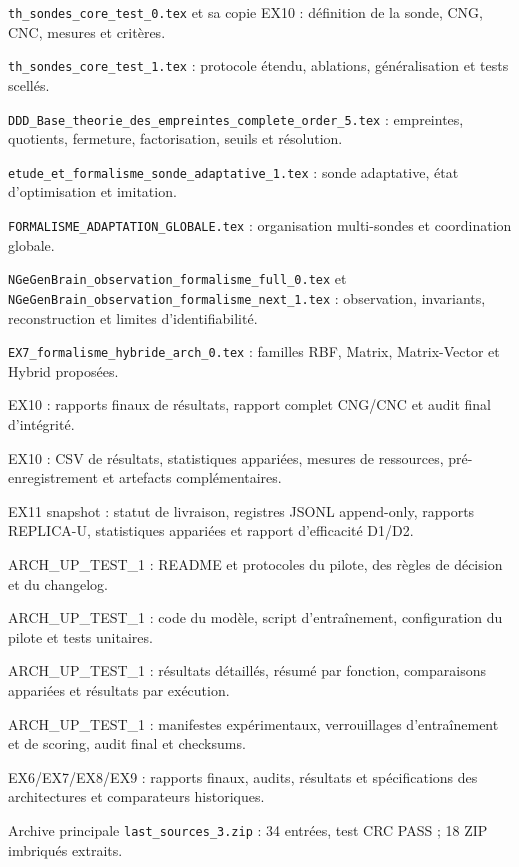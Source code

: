 \documentclass[11pt,a4paper]{article}
\newcommand{\code}[1]{\texttt{\small #1}}
\begin{document}
\begin{description}[leftmargin=1.2cm,labelwidth=0.9cm,style=nextline]
  \item[S1] \code{th\_\allowbreak{}sondes\_\allowbreak{}core\_\allowbreak{}test\_\allowbreak{}0.tex} et sa copie EX10 : définition de la sonde, CNG, CNC, mesures et critères.
  \item[S2] \code{th\_\allowbreak{}sondes\_\allowbreak{}core\_\allowbreak{}test\_\allowbreak{}1.tex} : protocole étendu, ablations, généralisation et tests scellés.
  \item[S3] \code{DDD\_\allowbreak{}Base\_\allowbreak{}theorie\_\allowbreak{}des\_\allowbreak{}empreintes\_\allowbreak{}complete\_\allowbreak{}order\_\allowbreak{}5.tex} : empreintes, quotients, fermeture, factorisation, seuils et résolution.
  \item[S4] \code{etude\_\allowbreak{}et\_\allowbreak{}formalisme\_\allowbreak{}sonde\_\allowbreak{}adaptative\_\allowbreak{}1.tex} : sonde adaptative, état d'optimisation et imitation.
  \item[S5] \code{FORMALISME\_\allowbreak{}ADAPTATION\_\allowbreak{}GLOBALE.tex} : organisation multi-sondes et coordination globale.
  \item[S6] \code{NGeGenBrain\_\allowbreak{}observation\_\allowbreak{}formalisme\_\allowbreak{}full\_\allowbreak{}0.tex} et \code{NGeGenBrain\_\allowbreak{}observation\_\allowbreak{}formalisme\_\allowbreak{}next\_\allowbreak{}1.tex} : observation, invariants, reconstruction et limites d'identifiabilité.
  \item[S7] \code{EX7\_\allowbreak{}formalisme\_\allowbreak{}hybride\_\allowbreak{}arch\_\allowbreak{}0.tex} : familles RBF, Matrix, Matrix-Vector et Hybrid proposées.
  \item[S8] EX10 : rapports finaux de résultats, rapport complet CNG/CNC et audit final d'intégrité.
  \item[S9] EX10 : CSV de résultats, statistiques appariées, mesures de ressources, pré-enregistrement et artefacts complémentaires.
  \item[S10] EX11 snapshot : statut de livraison, registres JSONL append-only, rapports REPLICA-U, statistiques appariées et rapport d'efficacité D1/D2.
  \item[S11] ARCH\_UP\_TEST\_1 : README et protocoles du pilote, des règles de décision et du changelog.
  \item[S12] ARCH\_UP\_TEST\_1 : code du modèle, script d'entraînement, configuration du pilote et tests unitaires.
  \item[S13] ARCH\_UP\_TEST\_1 : résultats détaillés, résumé par fonction, comparaisons appariées et résultats par exécution.
  \item[S14] ARCH\_UP\_TEST\_1 : manifestes expérimentaux, verrouillages d'entraînement et de scoring, audit final et checksums.
  \item[S15] EX6/\allowbreak{}EX7/\allowbreak{}EX8/\allowbreak{}EX9 : rapports finaux, audits, résultats et spécifications des architectures et comparateurs historiques.
  \item[S16] Archive principale \code{last\_\allowbreak{}sources\_\allowbreak{}3.zip} : 34 entrées, test CRC PASS ; 18 ZIP imbriqués extraits.
\end{description}
\end{document}
